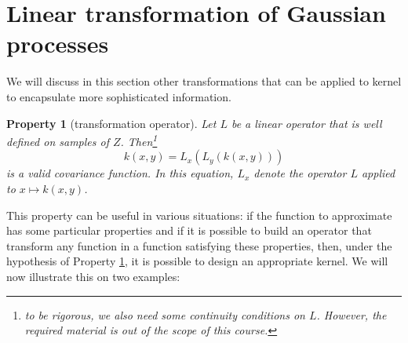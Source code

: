 \documentclass[twoside,openright]{report}
\newtheorem{property}{Property}
\begin{document}
\section{Linear transformation of Gaussian processes}
We will discuss in this section other transformations that can be applied to kernel to encapsulate more sophisticated information.


\begin{property}[transformation operator]
    Let $L$ be a linear operator that is well defined on samples of $Z$. Then\footnote{to be rigorous, we also need some continuity conditions on $L$. However, the required material is out of the scope of this course.} 
    \begin{equation}
        k(x,y) = L_x(L_y(k(x,y)))
    \end{equation}
    is a valid covariance function. In this equation, $L_x$ denote the operator $L$ applied to $x \mapsto k(x,y)$.
    \label{prop:lintransform}
\end{property}
This property can be useful in various situations: if the function to approximate has some particular properties and if it is possible to build an operator that transform any function in a function satisfying these properties, then, under the hypothesis of Property \ref{prop:lintransform}, it is possible to design an appropriate kernel. We will now illustrate this on two examples:
\end{document}
